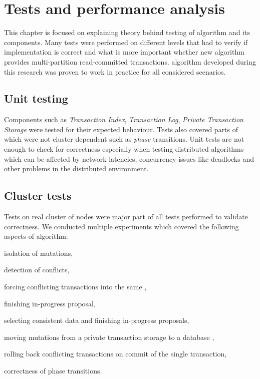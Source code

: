 
\chapter{Tests and performance analysis}\label{chapter:testing}

This chapter is focused on explaining theory behind testing of \mpt algorithm and its components. Many tests were performed on different levels that had to verify if implementation is correct and what is more important whether new \mpt algorithm provides multi-partition read-committed transactions. 
\mpt algorithm developed during this research was proven to work in practice for all considered scenarios. 

\section{Unit testing}
Components such as \emph{Transaction Index}, \emph{Transaction Log}, \emph{Private Transaction Storage} were  tested for their expected behaviour. Tests also covered parts of \mpt which were not cluster dependent such as \emph{phase} transitions. Unit tests are not enough to check for correctness especially when testing distributed algorithms which can be affected by network latencies, concurrency issues like deadlocks and other problems in the distributed environment. 

\section{Cluster tests}
Tests on real cluster of nodes were major part of all tests performed to validate \mpt correctness. We conducted multiple experiments which covered the following aspects of \mpt algorithm:
\begin{enumerate*}[label=\alph*)]
\item isolation of mutations,
\item detection of conflicts,
\item forcing conflicting transactions into the same \paxosRoundId,
\item finishing in-progress proposal,
\item selecting consistent data and finishing in-progress proposals,
\item moving mutations from a private transaction storage \txStorage to a database \database,
\item rolling back conflicting transactions on commit of the single transaction,
\item correctness of phase transitions.
\end{enumerate*}

